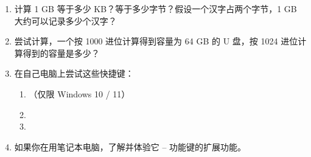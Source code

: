 \practice

\begin{enumerate}
  \item 计算 1 GB 等于多少 KB？等于多少字节？假设一个汉字占两个字节，1 GB 大约可以记录多少个汉字？
  \item 尝试计算，一个按 1000 进位计算得到容量为 64 GB 的 U 盘，按 1024 进位计算得到的容量是多少？
  \item 在自己电脑上尝试这些快捷键：
    \begin{enumerate}
      \item {} （仅限 Windows 10 / 11）
      \item {}
      \item {}
    \end{enumerate}
  \item 如果你在用笔记本电脑，了解并体验它  --  功能键的扩展功能。
\end{enumerate}
